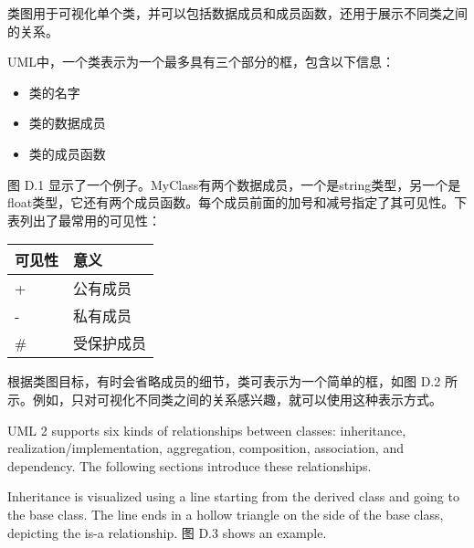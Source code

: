 类图用于可视化单个类，并可以包括数据成员和成员函数，还用于展示不同类之间的关系。


UML中，一个类表示为一个最多具有三个部分的框，包含以下信息：

\begin{itemize}
\item
类的名字

\item
类的数据成员

\item
类的成员函数
\end{itemize}

图 D.1 显示了一个例子。MyClass有两个数据成员，一个是string类型，另一个是float类型，它还有两个成员函数。每个成员前面的加号和减号指定了其可见性。下表列出了最常用的可见性：


\begin{longtable}{|l|l|}
\hline
\textbf{可见性} & \textbf{意义} \\ \hline
\endfirsthead
%
\endhead
%
+                   & 公有成员    \\ \hline
-                   & 私有成员   \\ \hline
\#                  & 受保护成员 \\ \hline
\end{longtable}

根据类图目标，有时会省略成员的细节，类可表示为一个简单的框，如图 D.2 所示。例如，只对可视化不同类之间的关系感兴趣，就可以使用这种表示方式。



UML 2 supports six kinds of relationships between classes: inheritance, realization/implementation, aggregation, composition, association, and dependency. The following sections introduce these relationships.


Inheritance is visualized using a line starting from the derived class and going to the base class. The line ends in a hollow triangle on the side of the base class, depicting the is-a relationship. 图 D.3 shows an example.

